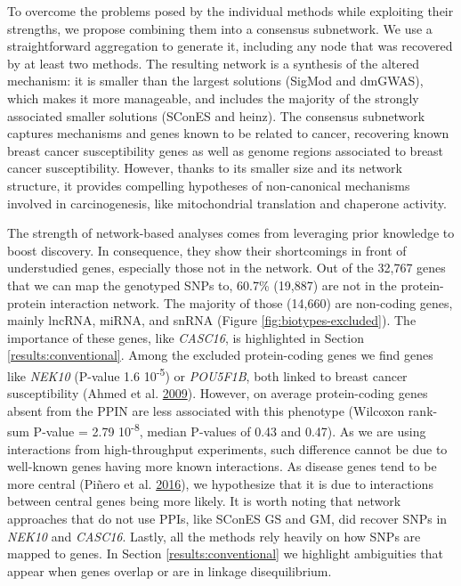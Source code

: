 \documentclass[
  11pt,
]{env/yjiao}
\begin{document}
To overcome the problems posed by the individual methods while
exploiting their strengths, we propose combining them into a consensus
subnetwork. We use a straightforward aggregation to generate it,
including any node that was recovered by at least two methods. The
resulting network is a synthesis of the altered mechanism: it is smaller
than the largest solutions (SigMod and dmGWAS), which makes it more
manageable, and includes the majority of the strongly associated smaller
solutions (SConES and heinz). The consensus subnetwork captures
mechanisms and genes known to be related to cancer, recovering known
breast cancer susceptibility genes as well as genome regions associated
to breast cancer susceptibility. However, thanks to its smaller size and
its network structure, it provides compelling hypotheses of
non-canonical mechanisms involved in carcinogenesis, like mitochondrial
translation and chaperone activity.

The strength of network-based analyses comes from leveraging prior
knowledge to boost discovery. In consequence, they show their
shortcomings in front of understudied genes, especially those not in the
network. Out of the 32,767 genes that we can map the genotyped SNPs to,
60.7\% (19,887) are not in the protein-protein interaction network. The
majority of those (14,660) are non-coding genes, mainly lncRNA, miRNA,
and snRNA (Figure \ref{fig:biotypes-excluded}). The importance of these genes,
like \emph{CASC16}, is highlighted in Section \ref{results:conventional}.
Among the excluded protein-coding
genes we find genes like \emph{NEK10} (P-value 1.6 10\textsuperscript{-5}) or \emph{POU5F1B}, both
linked to breast cancer susceptibility (Ahmed et al. \protect\hyperlink{ref-search_newly_2009}{2009}). However, on
average protein-coding genes absent from the PPIN are less associated
with this phenotype (Wilcoxon rank-sum P-value = 2.79 10\textsuperscript{-8}, median
P-values of 0.43 and 0.47). As we are using interactions from
high-throughput experiments, such difference cannot be due to well-known
genes having more known interactions. As disease genes tend to be more
central (Piñero et al. \protect\hyperlink{ref-pinero_uncovering_2016}{2016}), we hypothesize that it is due to
interactions between central genes being more likely. It is worth noting
that network approaches that do not use PPIs, like SConES GS and GM, did
recover SNPs in \emph{NEK10} and \emph{CASC16}. Lastly, all the methods rely
heavily on how SNPs are mapped to genes. In Section
\ref{results:conventional} we highlight ambiguities that appear
when genes overlap or are in linkage disequilibrium.
\end{document}
